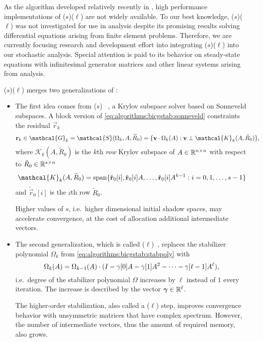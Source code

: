 As the algorithm developed relatively recently in
\citeyear{sleijpen2010exploiting}, high performance implementations of
($s$)($\ell$) are not widely available. To
our best knowledge, ($s$)($\ell$) was not
investigated for use in  analysis despite its promising
results solving differential equations arising from finite element
problems. Therefore, we are currently focusing research and
development effort into integrating
($s$)($\ell$) into our stochastic analysis.
Special attention is paid to its behavior on steady-state equations
with infinitesimal generator matrices and other linear systems arising
from  analysis.

($s$)($\ell$) merges two generalizations of
:

\begin{itemize}
\item The first idea comes from ($s$)%
  ~\citep{sonneveld2008idr}, a Krylov subspace solver based on
  Sonneveld subspaces. A block version of
  \cref{eq:algorithms:bicgstab:sonneveld} constraints the residual
  $\vec{r}_k$
  \begin{equation}
    \vec{r}_k \in \mathcal{G}_k = \mathcal{S}(\Omega_k, A, \widetilde{R}_0) =
    \{ \vec{v} \cdot \Omega_k(A) : \vec{v} \perp \mathcal{K}_k(A,
    \tilde{R}_0) \}\text,
  \end{equation}
  where $\mathcal{K}_k(A, \tilde{R}_0)$ is the $k$th \emph{row} Krylov
  subspace of $A \in \mathbb{R}^{n \times n}$ with respect to
  $\tilde{R}_0 \in \mathbb{R}^{s \times n}$
  \begin{equation}
    \mathcal{K}_k(A, \widetilde{R}_0) = \Span \{ \tilde{\vec{r}}_0[i],
    \tilde{\vec{r}}_0[i] A, \ldots, \tilde{\vec{r}}_0[i] A^{k - 1} : i =
    0, 1, \ldots, s - 1 \}
  \end{equation}
  and $\tilde{\vec{r}}_0[i]$ is the $i$th row $\tilde{R}_0$.

  Higher values of $s$, i.e.~higher dimensional initial shadow spaces,
  may accelerate convergence, at the cost of allocation additional
  intermediate vectors.

\item The second generalization, which is called
  ($\ell$)~\citep{sleijpen1993bicgstab}, replaces the
  stabilizer polynomial $\Omega_k$ from
  \cref{eq:algorithms:bicgstab:stabpoly} with
  \begin{equation}
    \Omega_k(A) = \Omega_{k - 1}(A) \cdot (I - \gamma[0] A - \gamma[1] A^2
    - \cdots - \gamma[\ell - 1] A^{\ell}) \text,
  \end{equation}
  i.e.~degree of the stabilizer polynomial $\Omega$ increases by $\ell$
  instead of $1$ every iteration. The increase is described by the
  vector $\vecarrow{\gamma} \in \RR^\ell$.

  The higher-order stabilization, also called a ($\ell$)
  step, improves convergence behavior with unsymmetric matrices that
  have complex spectrum. However, the number of intermediate vectors,
  thus the amount of required memory, also grows.
\end{itemize}

